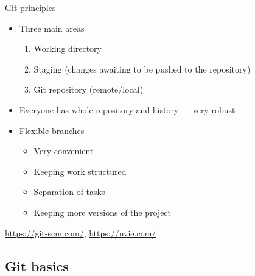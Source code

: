 \documentclass[compress, ucs, xelatex, 11pt, xcolor=svgnames, aspectratio=169,
	hyperref={
		bookmarks=true,
		unicode=true,
		colorlinks=true,
		pdftitle={Linux, command line and MetaCentrum},
		plainpages=false,
		pdfauthor={Vojtech Zeisek},
		pdfsubject={Course about use of Linux command line, writing shell scripts and using MetaCentrum of CESNET},
		pdfcreator={XeLaTeX},
		pdfkeywords={Linux, GNU, BASH, shell, command line, MetaCentrum},
		linkcolor=DarkRed, %
		anchorcolor=DarkBlue, %
		citecolor=Indigo, %
		filecolor=NavyBlue, %
		menucolor=DarkMagenta, %
		urlcolor=DarkBlue, %
		pdftex},
	url={hyphens, lowtilde} %
	]{beamer}
\renewcommand{\texttt}[1]{\colorbox{Beige}{{\ttfamily #1}}}
\begin{document}
\begin{frame}[fragile]{Git principles}
	\begin{multicols}{2}
		\begin{itemize}
			\item Three main areas
			\begin{enumerate}
				\item Working directory
				\item Staging (changes awaiting to be pushed to the repository)
				\item Git repository (remote/local)
			\end{enumerate}
			\item Everyone has whole repository and history --- very robust
			\item Flexible branches
			\begin{itemize}
				\item Very convenient
				\item Keeping work structured
				\item Separation of tasks
				\item Keeping more versions of the project
			\end{itemize}
		\end{itemize}
		\begin{center}
			\texttt{[image: git.png]}
		\end{center}
		\begin{flushright}
			\begin{footnotesize}
				\href{https://git-scm.com/book/en/v2/Getting-Started-About-Version-Control}{https://git-scm.com/}, \href{https://nvie.com/posts/a-successful-git-branching-model/}{https://nvie.com/}
			\end{footnotesize}
		\end{flushright}
	\end{multicols}
\end{frame}

\subsection{Git basics}
\end{document}
